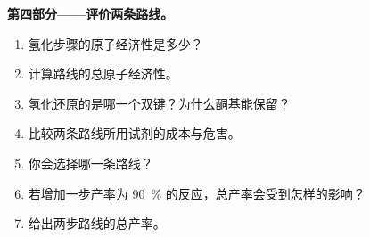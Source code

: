 \begin{problem}
\medskip
\noindent\textbf{第四部分——评价两条路线。}
\begin{enumerate}[resume]
  \item 氢化步骤的原子经济性是多少？
  \item 计算路线的总原子经济性。
  \item 氢化还原的是哪一个双键？为什么酮基能保留？
  \item 比较两条路线所用试剂的成本与危害。
  \item 你会选择哪一条路线？
  \item 若增加一步产率为 90~\% 的反应，总产率会受到怎样的影响？
  \item 给出两步路线的总产率。
\end{enumerate}
\end{problem}
